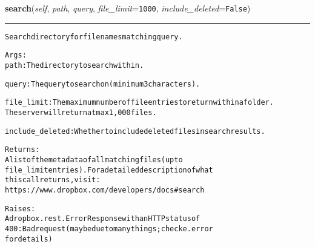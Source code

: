 \hspace{.8\funcindent}\begin{boxedminipage}{\funcwidth}

    \raggedright \textbf{search}(\textit{self}, \textit{path}, \textit{query}, \textit{file\_limit}={\tt 1000}, \textit{include\_deleted}={\tt False})

    \vspace{-1.5ex}

    \rule{\textwidth}{0.5\fboxrule}
\setlength{\parskip}{2ex}
\begin{alltt}
Search directory for filenames matching query.

Args:
    path: The directory to search within.

    query: The query to search on (minimum 3 characters).

    file\_limit: The maximum number of file entries to return within a folder.
       The server will return at max 1,000 files.

    include\_deleted: Whether to include deleted files in search results.

Returns:
    A list of the metadata of all matching files (up to
    file\_limit entries).  For a detailed description of what
    this call returns, visit:
    https://www.dropbox.com/developers/docs\#search

Raises:
    A dropbox.rest.ErrorResponse with an HTTP status of
    400: Bad request (may be due to many things; check e.error
    for details)
\end{alltt}

\setlength{\parskip}{1ex}
    \end{boxedminipage}

    \label{lib:dropbox:DropboxClient:revisions}

    \vspace{0.5ex}

